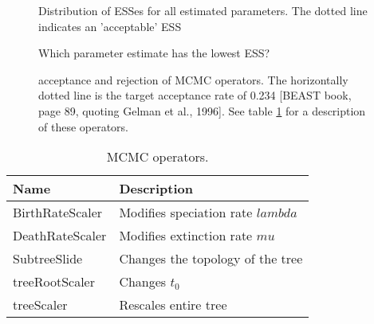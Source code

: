 \begin{figure}
  \caption{
    Distribution of ESSes for all estimated parameters. 
    The dotted line indicates an 'acceptable' ESS
  }
  \label{fig:ess_distribution}
\end{figure}

\begin{figure}
  \caption{
    Which parameter estimate has the lowest ESS?
  }
  \label{fig:lowest_ess}
\end{figure}

\begin{figure}
  \caption{
    acceptance and rejection of MCMC operators. The horizontally
    dotted line is the target acceptance rate of 0.234 [BEAST book, page 89, quoting
    Gelman et al., 1996]. See table \ref{table:mcmc_operator_descriptions}
    for a description of these operators.
  }
  \label{fig:acceptance_mcmc_operators}
\end{figure}

\begin{table}
  \centering 
  \begin{tabular}{l l}
    \hline
    Name & Description \\
    \hline
    \hline
    BirthRateScaler & Modifies speciation rate $lambda$ \\
    DeathRateScaler & Modifies extinction rate $mu$ \\
    SubtreeSlide & Changes the topology of the tree \\
    treeRootScaler & Changes $t_0$ \\
    treeScaler & Rescales entire tree \\
    \hline
  \end{tabular}
  \caption{
    MCMC operators.
  }
  \label{table:mcmc_operator_descriptions}
\end{table}

